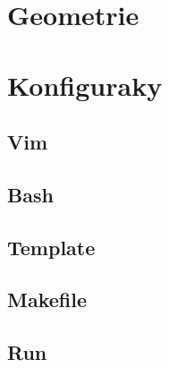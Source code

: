 \documentclass[10pt, a4paper, twoside]{article}
\begin{document}
\newpage

\section{Geometrie}


\section{Konfiguraky}
\subsection{Vim}

\subsection{Bash}

\subsection{Template}

\subsection{Makefile}

\subsection{Run}

\end{document}
